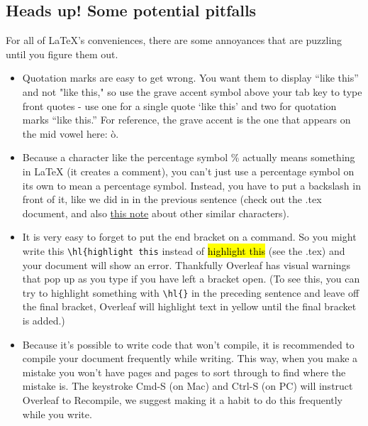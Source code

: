 \documentclass[output=paper,colorlinks,citecolor=brown,
]{langscibook}
\begin{document}
\subsection{Heads up! Some potential pitfalls}

For all of \LaTeX{}'s conveniences, there are some annoyances that are puzzling until you figure them out. 

\begin{itemize}

    \item Quotation marks are easy to get wrong. You want them to display ``like this'' and not "like this," so use the grave accent symbol above your tab key to type front quotes - use one for a single quote `like this' and two for quotation marks ``like this.'' For reference, the grave accent is the one that appears on the mid vowel here: \`o.

    \item Because a character like the percentage symbol \% actually means something in \LaTeX{} (it creates a comment), you can't just use a percentage symbol on its own to mean a percentage symbol. Instead, you have to put a backslash in front of it, like we did in in the previous sentence (check out the .tex document, and also \href{http://ptmartins.info/latex/#special-characters}{this note} about other similar characters).
    
    \item It is very easy to forget to put the end bracket on a command. So you might write this \verb|\hl{highlight this| instead of \hl{highlight this} (see the .tex) and your document will show an error. Thankfully Overleaf has visual warnings that pop up as you type if you have left a bracket open. (To see this, you can try to highlight something with \verb|\hl{}| in the preceding sentence and leave off the final bracket, Overleaf will highlight text in yellow until the final bracket is added.)
    
    \item Because it's possible to write code that won't compile, it is recommended to compile your document frequently while writing. This way, when you make a mistake you won't have pages and pages to sort through to find where the mistake is. The keystroke Cmd-S (on Mac) and Ctrl-S (on PC) will instruct Overleaf to Recompile, we suggest making it a habit to do this frequently while you write. %

\end{itemize}
\end{document}
